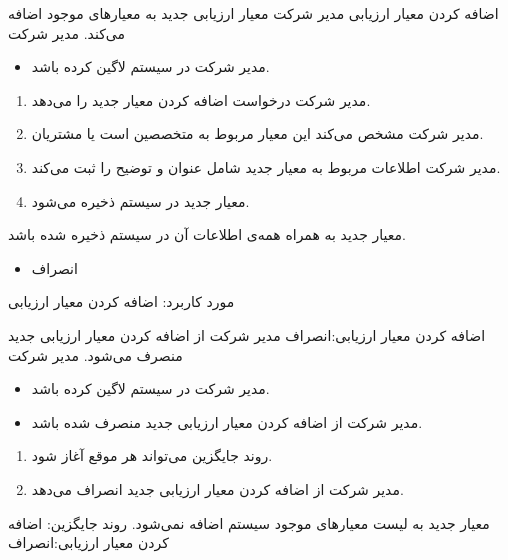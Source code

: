 \usecase
{
	 اضافه کردن معیار ارزیابی
}
{}
{
مدیر شرکت معیار ارزیابی جدید به معیارهای موجود اضافه می‌کند.
}
{
مدیر شرکت
}
{
}
{
	\begin{itemize}
	\vspace*{-0.6cm}
	\item 
	مدیر شرکت در سیستم لاگین کرده باشد.
\end{itemize}	
}
{
	\vspace*{-0.6cm}
\begin{enumerate}
	\item
	مدیر شرکت درخواست اضافه کردن معیار جدید را می‌دهد.
	\item
	مدیر شرکت مشخص می‌کند این معیار مربوط به متخصصین است یا مشتریان.
	\item
		مدیر شرکت اطلاعات مربوط به معیار جدید شامل عنوان و توضیح را ثبت می‌کند.
		\item
		معیار جدید در سیستم ذخیره می‌شود.
\end{enumerate}
}
{
معیار جدید به همراه همه‌ی اطلاعات آن در سیستم ذخیره شده باشد.
}
{
	\begin{itemize}
		\vspace*{-0.6cm}
		\item 
		انصراف
	\end{itemize}
}
{
	مورد کاربرد: اضافه کردن معیار ارزیابی
}




\alternativeflow
{
 اضافه کردن معیار ارزیابی:انصراف
}
{}
{
	مدیر شرکت از اضافه کردن معیار ارزیابی جدید منصرف می‌شود.
}
{
	مدیر شرکت
}
{}
{
	\begin{itemize}
		\vspace*{-0.6cm}
		\item 
		مدیر شرکت در سیستم لاگین کرده باشد.
		\item
		مدیر شرکت از اضافه کردن معیار ارزیابی جدید منصرف شده باشد.
	\end{itemize}
}
{
	\vspace*{-0.6cm}
	\begin{enumerate}
		\item 
		روند جایگزین می‌تواند هر موقع آغاز شود.
		\item
		مدیر شرکت از اضافه کردن معیار ارزیابی جدید انصراف می‌دهد.
	\end{enumerate}
}
{
معیار جدید به لیست معیارهای موجود سیستم اضافه نمی‌شود.
}
{
	روند جایگزین:  اضافه کردن معیار ارزیابی:انصراف
}


